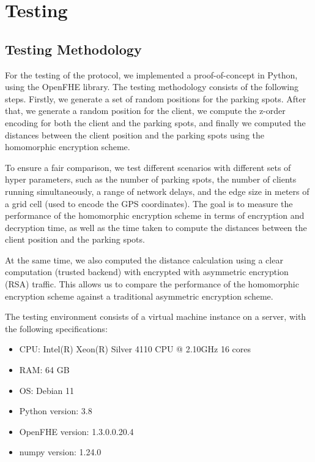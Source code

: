 
\chapter{Testing}
\section{Testing Methodology}

For the testing of the protocol, we implemented a proof-of-concept in Python, using the OpenFHE library\cite{openFHE}. The testing methodology consists of the following steps. Firstly, we generate a set of random positions for the parking spots. After that, we generate a random position for the client, we compute the z-order encoding for both the client and the parking spots, and finally we computed the distances between the client position and the parking spots using the homomorphic encryption scheme.

To ensure a fair comparison, we test different scenarios with different sets of hyper parameters, such as the number of parking spots, the number of clients running simultaneously, a range of network delays, and the edge size in meters of a grid cell (used to encode the GPS coordinates). The goal is to measure the performance of the homomorphic encryption scheme in terms of encryption and decryption time, as well as the time taken to compute the distances between the client position and the parking spots.

At the same time, we also computed the distance calculation using a clear computation (trusted backend) with encrypted with asymmetric encryption (RSA) traffic. This allows us to compare the performance of the homomorphic encryption scheme against a traditional asymmetric encryption scheme.

The testing environment consists of a virtual machine instance on a server, with the following specifications:
\begin{itemize}
    \item CPU: Intel(R) Xeon(R) Silver 4110 CPU @ 2.10GHz 16 cores
    \item RAM: 64 GB
    \item OS: Debian 11
    \item Python version: 3.8
    \item OpenFHE version: 1.3.0.0.20.4
    \item numpy version: 1.24.0
\end{itemize}

